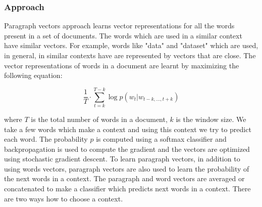 \subsubsection{Approach}
Paragraph vectors approach learns vector representations for all the words present in a set of documents. The words which are used in a similar context have similar vectors. For example, words like "data" and "dataset" which are used, in general, in similar contexts have are represented by vectors that are close. The vector representations of words in a document are learnt by maximizing the following equation:

\begin{equation}
\frac{1}{T} \cdot \sum_{t=k}^{T-k} \log p(w_t|w_{t-k,...,t+k})
\end{equation}

where $T$ is the total number of words in a document, $k$ is the window size. We take a few words which make a context and using this context we try to predict each word. The probability $p$ is computed using a softmax classifier and backpropagation is used to compute the gradient and the vectors are optimized using stochastic gradient descent. To learn paragraph vectors, in addition to using words vectors, paragraph vectors are also used to learn the probability of the next words in a context. The paragraph and word vectors are averaged or concatenated to make a classifier which predicts next words in a context. There are two ways how to choose a context.

